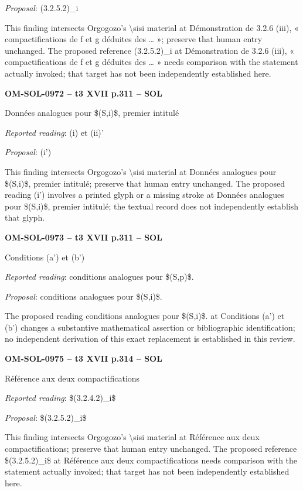 \emph{Proposal}: (3.2.5.2)\_i\par
This finding intersects Orgogozo's \textbackslash{}sisi material at Démonstration de 3.2.6 (iii), « compactifications de f et g déduites des … »; preserve that human entry unchanged. The proposed reference (3.2.5.2)\_i at Démonstration de 3.2.6 (iii), « compactifications de f et g déduites des … » needs comparison with the statement actually invoked; that target has not been independently established here.\par
\par\noindent\textbf{OM-SOL-0972 -- t3 XVII p.311 -- SOL}\par
Données analogues pour \$(S,i)\$, premier intitulé\par
\emph{Reported reading}: (i) et (ii)'\par
\emph{Proposal}: (i')\par
This finding intersects Orgogozo's \textbackslash{}sisi material at Données analogues pour \$(S,i)\$, premier intitulé; preserve that human entry unchanged. The proposed reading (i') involves a printed glyph or a missing stroke at Données analogues pour \$(S,i)\$, premier intitulé; the textual record does not independently establish that glyph.\par
\par\noindent\textbf{OM-SOL-0973 -- t3 XVII p.311 -- SOL}\par
Conditions (a') et (b')\par
\emph{Reported reading}: conditions analogues pour \$(S,p)\$.\par
\emph{Proposal}: conditions analogues pour \$(S,i)\$.\par
The proposed reading conditions analogues pour \$(S,i)\$. at Conditions (a') et (b') changes a substantive mathematical assertion or bibliographic identification; no independent derivation of this exact replacement is established in this review.\par
\par\noindent\textbf{OM-SOL-0975 -- t3 XVII p.314 -- SOL}\par
Référence aux deux compactifications\par
\emph{Reported reading}: \$(3.2.4.2)\_i\$\par
\emph{Proposal}: \$(3.2.5.2)\_i\$\par
This finding intersects Orgogozo's \textbackslash{}sisi material at Référence aux deux compactifications; preserve that human entry unchanged. The proposed reference \$(3.2.5.2)\_i\$ at Référence aux deux compactifications needs comparison with the statement actually invoked; that target has not been independently established here.\par
